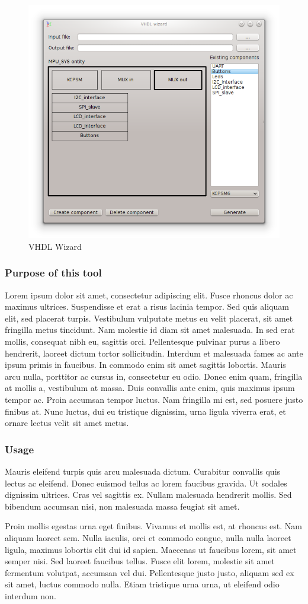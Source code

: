 \begin{figure}[h]
    \centering
    \includegraphics[width=.5\textwidth]{img/VHDL_wizard.png}
    \caption{VHDL Wizard}
\end{figure}

\subsubsection{Purpose of this tool}
    Lorem ipsum dolor sit amet, consectetur adipiscing elit. Fusce rhoncus dolor ac maximus ultrices. Suspendisse et erat a risus lacinia tempor. Sed quis aliquam elit, sed placerat turpis. Vestibulum vulputate metus eu velit placerat, sit amet fringilla metus tincidunt. Nam molestie id diam sit amet malesuada. In sed erat mollis, consequat nibh eu, sagittis orci. Pellentesque pulvinar purus a libero hendrerit, laoreet dictum tortor sollicitudin. Interdum et malesuada fames ac ante ipsum primis in faucibus. In commodo enim sit amet sagittis lobortis. Mauris arcu nulla, porttitor ac cursus in, consectetur eu odio. Donec enim quam, fringilla at mollis a, vestibulum at massa. Duis convallis ante enim, quis maximus ipsum tempor ac. Proin accumsan tempor luctus. Nam fringilla mi est, sed posuere justo finibus at. Nunc luctus, dui eu tristique dignissim, urna ligula viverra erat, et ornare lectus velit sit amet metus.

\subsubsection{Usage}
    Mauris eleifend turpis quis arcu malesuada dictum. Curabitur convallis quis lectus ac eleifend. Donec euismod tellus ac lorem faucibus gravida. Ut sodales dignissim ultrices. Cras vel sagittis ex. Nullam malesuada hendrerit mollis. Sed bibendum accumsan nisi, non malesuada massa feugiat sit amet.

    Proin mollis egestas urna eget finibus. Vivamus et mollis est, at rhoncus est. Nam aliquam laoreet sem. Nulla iaculis, orci et commodo congue, nulla nulla laoreet ligula, maximus lobortis elit dui id sapien. Maecenas ut faucibus lorem, sit amet semper nisi. Sed laoreet faucibus tellus. Fusce elit lorem, molestie sit amet fermentum volutpat, accumsan vel dui. Pellentesque justo justo, aliquam sed ex sit amet, luctus commodo nulla. Etiam tristique urna urna, ut eleifend odio interdum non.

